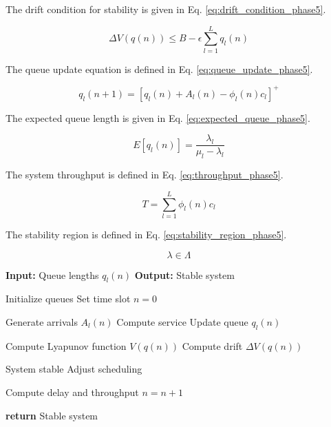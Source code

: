 \documentclass[a4paper,fleqn]{cas-dc}
\numberwithin{equation}{section}
\begin{document}
The drift condition for stability is given in Eq. \ref{eq:drift_condition_phase5}.

\begin{equation}
\Delta V(q(n)) \leq B - \epsilon \sum_{l=1}^{L} q_l(n)
\label{eq:drift_condition_phase5}
\end{equation}

The queue update equation is defined in Eq. \ref{eq:queue_update_phase5}.

\begin{equation}
q_l(n+1) = [q_l(n) + A_l(n) - \phi_l(n)c_l]^+
\label{eq:queue_update_phase5}
\end{equation}

The expected queue length is given in Eq. \ref{eq:expected_queue_phase5}.

\begin{equation}
E[q_l(n)] = \frac{\lambda_l}{\mu_l - \lambda_l}
\label{eq:expected_queue_phase5}
\end{equation}

The system throughput is defined in Eq. \ref{eq:throughput_phase5}.

\begin{equation}
T = \sum_{l=1}^{L} \phi_l(n)c_l
\label{eq:throughput_phase5}
\end{equation}

The stability region is defined in Eq. \ref{eq:stability_region_phase5}.

\begin{equation}
\lambda \in \Lambda
\label{eq:stability_region_phase5}
\end{equation}

\begin{algorithm}
\caption{Phase 5: Queue Update and Stability using Lyapunov}
\begin{algorithmic}

\STATE \textbf{Input:} Queue lengths $q_l(n)$
\STATE \textbf{Output:} Stable system

\STATE Initialize queues
\STATE Set time slot $n = 0$


        \STATE Generate arrivals $A_l(n)$
        \STATE Compute service
        \STATE Update queue $q_l(n)$
    \ENDFOR

    \STATE Compute Lyapunov function $V(q(n))$
    \STATE Compute drift $\Delta V(q(n))$

        \STATE System stable
    \ELSE
        \STATE Adjust scheduling
    \ENDIF

    \STATE Compute delay and throughput
    \STATE $n = n + 1$

\ENDWHILE

\STATE \textbf{return} Stable system

\end{algorithmic}
\end{algorithm}
\end{document}
